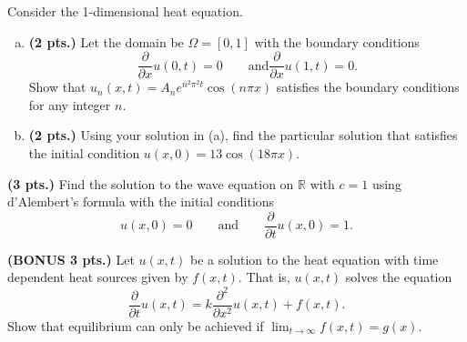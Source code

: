 \documentclass[12pt]{amsbook}
\begin{document}
\begin{problem}
Consider the 1-dimensional heat equation.
\begin{enumerate}[(a)]
    \item \textbf{(2 pts.)} Let the domain be $\Omega = [0,1]$ with the boundary conditions 
        \[
    \frac{\partial}{\partial x}u(0,t)=0 \qquad \textrm{and} \frac{\partial}{\partial x} u(1,t)=0.
    \]
    Show that $u_n(x,t) = A_n e^{n^2 \pi^2 t}\cos(n\pi x)$ satisfies the boundary conditions for any integer $n$.
    \item \textbf{(2 pts.)} Using your solution in (a), find the particular solution that satisfies the initial condition $u(x,0)=13 \cos(18\pi x)$.
\end{enumerate}
\end{problem}
\vspace*{.5cm}

\begin{problem}
\textbf{(3 pts.)} Find the solution to the wave equation on $\mathbb{R}$ with $c=1$ using d'Alembert's formula with the initial conditions
\[
u(x,0)=0 \qquad \textrm{and} \qquad \frac{\partial}{\partial t} u(x,0) = 1.
\]
\end{problem}
\vspace*{.5cm}

\begin{problem}
\textbf{(BONUS 3 pts.)}  Let $u(x,t)$ be a solution to the heat equation with time dependent heat sources given by $f(x,t)$. That is, $u(x,t)$ solves the equation
    \[
    \frac{\partial}{\partial t} u(x,t) = k\frac{\partial^2}{\partial x^2}u(x,t) + f(x,t).
    \]
    Show that equilibrium can only be achieved if $\lim_{t\to \infty} f(x,t) = g(x)$.
\end{problem}
\end{document}
